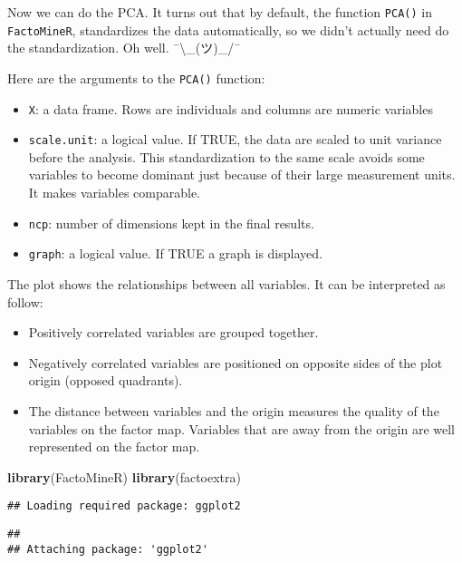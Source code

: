 \documentclass[
]{article}
\newenvironment{Shaded}{\begin{snugshade}}{\end{snugshade}}
\newcommand{\FunctionTok}[1]{\textcolor[rgb]{0.13,0.29,0.53}{\textbf{#1}}}
\newcommand{\NormalTok}[1]{#1}
\begin{document}
Now we can do the PCA. It turns out that by default, the function
\texttt{PCA()} in \texttt{FactoMineR}, standardizes the data
automatically, so we didn't actually need do the standardization. Oh
well. ¯\textbackslash\_(ツ)\_/¯

Here are the arguments to the \texttt{PCA()} function:

\begin{itemize}
\item
  \texttt{X}: a data frame. Rows are individuals and columns are numeric
  variables
\item
  \texttt{scale.unit}: a logical value. If TRUE, the data are scaled to
  unit variance before the analysis. This standardization to the same
  scale avoids some variables to become dominant just because of their
  large measurement units. It makes variables comparable.
\item
  \texttt{ncp}: number of dimensions kept in the final results.
\item
  \texttt{graph}: a logical value. If TRUE a graph is displayed.
\end{itemize}

The plot shows the relationships between all variables. It can be
interpreted as follow:

\begin{itemize}
\item
  Positively correlated variables are grouped together.
\item
  Negatively correlated variables are positioned on opposite sides of
  the plot origin (opposed quadrants).
\item
  The distance between variables and the origin measures the quality of
  the variables on the factor map. Variables that are away from the
  origin are well represented on the factor map.
\end{itemize}

\begin{Shaded}
\begin{Highlighting}[]
\FunctionTok{library}\NormalTok{(FactoMineR)}
\FunctionTok{library}\NormalTok{(factoextra)}
\end{Highlighting}
\end{Shaded}

\begin{verbatim}
## Loading required package: ggplot2
\end{verbatim}

\begin{verbatim}
## 
## Attaching package: 'ggplot2'
\end{verbatim}
\end{document}
